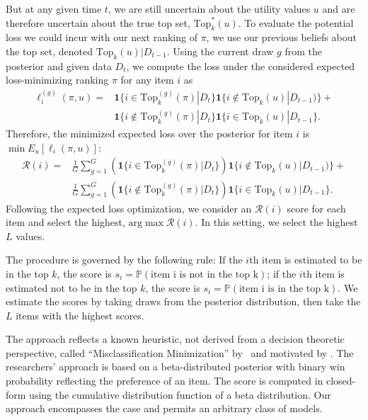 \documentclass[nonblindrev]{informs3}
\newcommand{\numperset}{L}
\newcommand{\topset}{\text{Top}_k}
\newcommand{\risk}{\mathcal{R}}
\begin{document}
But at any given time $t$, we are still uncertain about the utility values $u$ and are therefore uncertain about the true top set, $\topset^{*}(u)$. To evaluate the potential loss we could incur with our next ranking of $\pi$, we use our previous beliefs about the top set, denoted $\topset(u) | D_{t-1}$. Using the current draw $g$ from the posterior and given data $D_{t}$, we compute the loss under the considered expected loss-minimizing ranking $\pi$ for any item $i$ as  
\begin{align}
\ell_i^{(g)}(\pi,u) = 
& \mathbf{1}\{ i \in \topset^{(g)}(\pi) | D_{t} \} 
  \mathbf{1}\{ i \notin \topset(u) | D_{t-1} ) \} + \nonumber \\
& \mathbf{1}\{ i \notin \topset^{(g)}(\pi) | D_{t} \} 
  \mathbf{1}\{ i \in \topset(u)| D_{t-1} \}.  
\end{align}
Therefore, the minimized expected loss over the posterior for item $i$ is $\min E_{u}[\ell_i(\pi,u)]$:
\begin{align}
\risk(i) =  
& \frac{1}{G} \sum_{g=1}^{G} 
   \left( \mathbf{1}\{ i \in \topset^{(g)}(\pi) | D_{t} \} \right)
  \mathbf{1}\{ i \notin \topset(u) | D_{t-1} ) \} + \nonumber \\ 
& \frac{1}{G} \sum_{g=1}^{G}
   \left( \mathbf{1}\{ i \notin \topset^{(g)}(\pi) | D_{t} \} \right)
  \mathbf{1}\{ i \in \topset(u)| D_{t-1} \}.  
\end{align}
Following the expected loss optimization, we consider an $\risk(i)$ score for each item and select the highest, $\text{arg}\max \risk(i)$. In this setting, we select the highest $L$ values.

The procedure is governed by the following rule: If the $i$th item is estimated to be in the top $k$, the score is $s_i=\mathbb{P} (\text{item i is not in the top k})$; if the $i$th item is estimated not to be in the top $k$, the score is $s_i=\mathbb{P} (\text{item i is in the top k})$. We estimate the scores by taking draws from the posterior distribution, then take the $\numperset$ items with the highest scores.

The approach reflects a known heuristic, not derived from a decision theoretic perspective, called ``Misclassification Minimization'' by~\cite{toubia2007adaptive} and motivated by \cite{bradlow1998some}. The researchers' approach is based on a beta-distributed posterior with binary win probability reflecting the preference of an item. The score is computed in closed-form using the cumulative distribution function of a beta distribution. Our approach encompasses the case and permits an arbitrary class of models. 
\end{document}
